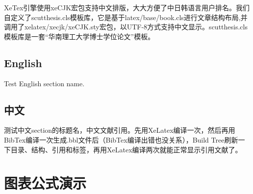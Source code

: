 \documentclass[unicode,pdfcover]{scutthesis}
\begin{document}
XeTex引擎使用xeCJK宏包支持中文排版，大大方便了中日韩语言用户排名。我们自定义了scutthesis.cls模板库，它是基于latex/base/book.cls进行文章结构布局,并调用了xelatex/xecjk/xeCJK.sty宏包，以UTF-8方式支持中文显示。scutthesis.cls模板库是一套“华南理工大学博士学位论文”模板。

\section{English}
Test English section name.

\section{中文}
测试中文section的标题名，中文文献引用\cite{cnproceed, wang_model_2009}。先用XeLatex编译一次，然后再用BibTex编译一次生成.bbl文件后（BibTex编译出错也没关系），Build Tree刷新一下目录、结构、引用和标签，再用XeLatex编译两次就能正常显示引用文献了。

\chapter{图表公式演示}
\end{document}
